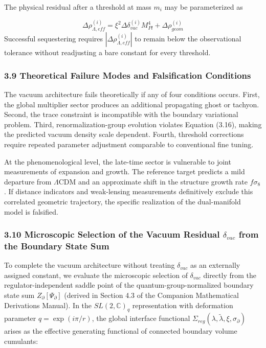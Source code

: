 \documentclass[aps,prd,onecolumn,superscriptaddress,nofootinbib,longbibliography,10pt]{revtex4-2}
\begin{document}
  The physical residual after a threshold at mass \(m_i\) may be parameterized as


  \[ \Delta\rho^{(i)}_{\Lambda,eff} = \xi^2 \Delta\delta^{(i)}_{vac} M_{Pl}^4 + \Delta\rho^{(i)}_{geom} \]
  Successful sequestering requires \(|\Delta\rho^{(i)}_{\Lambda,eff}|\) to remain below the observational tolerance without readjusting a bare constant for every threshold.



  
\subsubsection*{3.9 Theoretical Failure Modes and Falsification Conditions}

  The vacuum architecture fails theoretically if any of four conditions occurs. First, the global multiplier sector produces an additional propagating ghost or tachyon. Second, the trace constraint is incompatible with the boundary variational problem. Third, renormalization-group evolution violates Equation (3.16), making the predicted vacuum density scale dependent. Fourth, threshold corrections require repeated parameter adjustment comparable to conventional fine tuning.


  At the phenomenological level, the late-time sector is vulnerable to joint measurements of expansion and growth. The reference target predicts a mild departure from $\Lambda$CDM and an approximate shift in the structure growth rate \(f\sigma_8\). If distance indicators and weak-lensing measurements definitively exclude this correlated geometric trajectory, the specific realization of the dual-manifold model is falsified.



  
\subsubsection*{3.10 Microscopic Selection of the Vacuum Residual \(\delta_{vac}\) from the Boundary State Sum}

  To complete the vacuum architecture without treating \(\delta_{vac}\) as an externally assigned constant, we evaluate the microscopic selection of \(\delta_{vac}\) directly from the regulator-independent saddle point of the quantum-group-normalized boundary state sum \(Z_\partial[\Psi_\partial]\) (derived in Section 4.3 of the Companion Mathematical Derivations Manual). In the \(SL(2,\mathbb{C})_q\) representation with deformation parameter \(q = \exp(i\pi/r)\), the global interface functional \(\Sigma_{reg}(\lambda,\tilde{\lambda},\xi,\sigma_\partial)\) arises as the effective generating functional of connected boundary volume cumulants:
\end{document}
